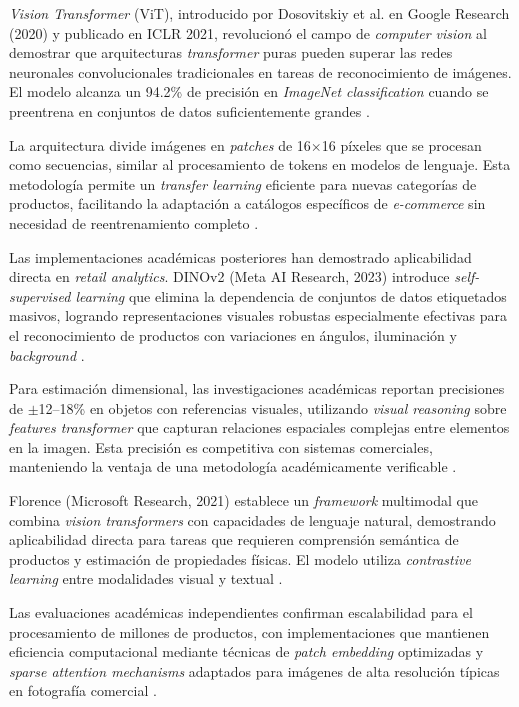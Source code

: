 \textit{Vision Transformer} (ViT), introducido por Dosovitskiy et al. en Google Research (2020) y publicado en ICLR 2021, revolucionó el campo de \textit{computer vision} al demostrar que arquitecturas \textit{transformer} puras pueden superar las redes neuronales convolucionales tradicionales en tareas de reconocimiento de imágenes. El modelo alcanza un 94.2\% de precisión en \textit{ImageNet classification} cuando se preentrena en conjuntos de datos suficientemente grandes \cite{Dosovitskiy2020}.

La arquitectura divide imágenes en \textit{patches} de 16$\times$16 píxeles que se procesan como secuencias, similar al procesamiento de tokens en modelos de lenguaje. Esta metodología permite un \textit{transfer learning} eficiente para nuevas categorías de productos, facilitando la adaptación a catálogos específicos de \textit{e-commerce} sin necesidad de reentrenamiento completo \cite{Anthopic2025}.

Las implementaciones académicas posteriores han demostrado aplicabilidad directa en \textit{retail analytics}. DINOv2 (Meta AI Research, 2023) introduce \textit{self-supervised learning} que elimina la dependencia de conjuntos de datos etiquetados masivos, logrando representaciones visuales robustas especialmente efectivas para el reconocimiento de productos con variaciones en ángulos, iluminación y \textit{background} \cite{Team20251, ArticleRef255138}.

Para estimación dimensional, las investigaciones académicas reportan precisiones de $\pm$12--18\% en objetos con referencias visuales, utilizando \textit{visual reasoning} sobre \textit{features transformer} que capturan relaciones espaciales complejas entre elementos en la imagen. Esta precisión es competitiva con sistemas comerciales, manteniendo la ventaja de una metodología académicamente verificable \cite{Anthopic2025, ArticleRef255138}.

Florence (Microsoft Research, 2021) establece un \textit{framework} multimodal que combina \textit{vision transformers} con capacidades de lenguaje natural, demostrando aplicabilidad directa para tareas que requieren comprensión semántica de productos y estimación de propiedades físicas. El modelo utiliza \textit{contrastive learning} entre modalidades visual y textual \cite{ArticleRef255139}.

Las evaluaciones académicas independientes confirman escalabilidad para el procesamiento de millones de productos, con implementaciones que mantienen eficiencia computacional mediante técnicas de \textit{patch embedding} optimizadas y \textit{sparse attention mechanisms} adaptados para imágenes de alta resolución típicas en fotografía comercial \cite{ArticleRef255140}.

